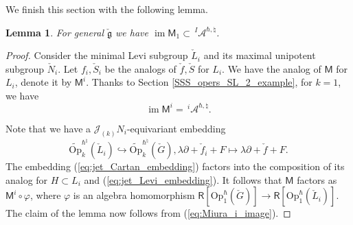 \documentclass{amsart}
\newtheorem{Lem}[Thm]{Lemma}
\theoremstyle{definition}
\newcommand{\sss}{\subsubsection{}}
\newcommand{\D}{\sD}
\newcommand{\sD}{\mathscr{D}}
\newcommand{\on}{\mathrm}
\newcommand{\Ring}{\mathsf{R}}
\newcommand{\g}{\mathfrak{g}}
\newcommand{\A}{\mathscr{A}}
\newcommand{\Jet}{\mathscr{J}}
\newcommand{\Op}{\on{Op}}
\numberwithin{equation}{section}
\begin{document}
\sss We finish this section with the following lemma.

\begin{Lem}\label{Lem:Miura_image_contained}
For general $\check{\g}$ we have $\operatorname{im}\mathsf{M}_1\subset \,^I\!\A^{\hbar,\natural}$.
\end{Lem}
\begin{proof}
Consider the minimal Levi subgroup $\check{L}_i$ and its maximal unipotent subgroup $\check{N}_i$. Let $f_i,\check{S}_i$ be the analogs of $\check{f}, \check{S}$ for $L_i$. We have the analog of $\mathsf{M}$ for $L_i$, denote it by $\mathsf{M}^i$. Thanks to 
Section \ref{SSS_opers_SL_2_example}, for $k=1$, we have 
\begin{equation}\label{eq:Miura_i_image}
\operatorname{im}\mathsf{M}^i=\,^i\!\A^{\hbar,\natural}.
\end{equation}

Note that we have 
a $\Jet_{(k)} N_i$-equivariant embedding 
\begin{equation}\label{eq:jet_Levi_embedding}
\widetilde{\Op}^{\hbar^\natural}_k(\check{L}_i)\hookrightarrow \widetilde{\Op}^{\hbar^\natural}_k(\check{G}),
\lambda \partial+\check{f}_i+F\mapsto \lambda\partial+\check{f}+F.
\end{equation}
The embedding (\ref{eq:jet_Cartan_embedding}) factors into the composition of its analog for $H\subset L_i$ and (\ref{eq:jet_Levi_embedding}). It follows that $\mathsf{M}$ factors as $\mathsf{M}^i\circ \varphi$, where $\varphi$ is an algebra homomorphism $\Ring[\Op^\hbar_1(\check{G})]\rightarrow 
\Ring[\Op^\hbar_1(\check{L}_i)]$.  The claim of the lemma now follows from (\ref{eq:Miura_i_image}).
\end{proof}

\end{document}
